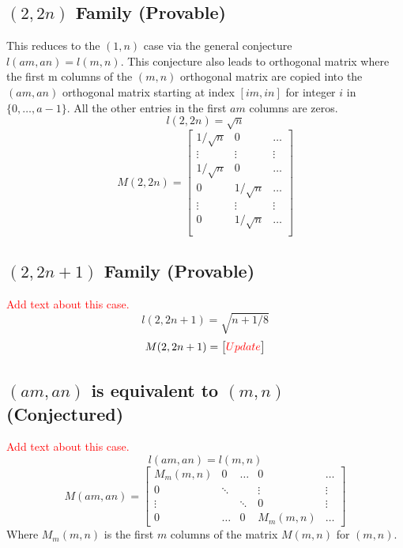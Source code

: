 \documentclass[12pt,titlepage]{article}
\begin{document}
\subsection{$(2,2n)$ Family (Provable)}
\label{sec:2_2n}
This reduces to the $(1,n)$ case via the general conjecture $l(am,an) = l(m,n)$.
This conjecture also leads to orthogonal matrix where the first m columns of
the $(m,n)$ orthogonal matrix are copied into the $(am,an)$ orthogonal matrix
starting at index $[im,in]$ for integer $i$ in $\{0, \ldots, a-1\}$.  All the
other entries in the first $am$ columns are zeros.
\begin{equation*}
l(2,2n) = \sqrt{n}
\end{equation*}
\begin{equation*}
M(2,2n) =
\begin{bmatrix}
1/\sqrt{n} & 0          & \ldots \\
\vdots     & \vdots     & \vdots \\
1/\sqrt{n} & 0          & \ldots \\
0          & 1/\sqrt{n} & \ldots \\
\vdots     & \vdots     & \vdots \\
0          & 1/\sqrt{n} & \ldots \\
\end{bmatrix}
\end{equation*}

\subsection{$(2,2n+1)$ Family (Provable)}
\label{sec:2_2n+1}
\textcolor{red}{
Add text about this case.
}
\begin{equation*}
l(2,2n+1) = \sqrt{n + 1/8}
\end{equation*}
\begin{equation*}
M(2,2n+1) =
\begin{bmatrix}
\textcolor{red}{Update}
\end{bmatrix}
\end{equation*}

\subsection{$(am,an)$ is equivalent to $(m,n)$ (Conjectured)}
\textcolor{red}{
Add text about this case.
}
\begin{equation*}
l(am,an) = l(m,n)
\end{equation*}
\begin{equation*}
M(am,an) =
\begin{bmatrix}
M_m(m,n) & 0      & \ldots & 0        & \ldots \\
0        & \ddots &        & \vdots   & \vdots \\
\vdots   &        & \ddots & 0        & \vdots \\
0        & \ldots & 0      & M_m(m,n) & \ldots
\end{bmatrix}
\end{equation*}
Where $M_m(m,n)$ is the first $m$ columns of the matrix $M(m,n)$ for $(m,n)$.
\end{document}
